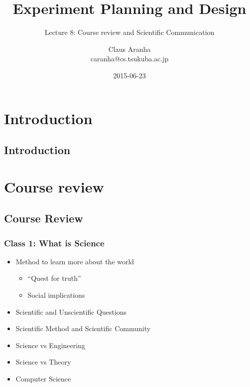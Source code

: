\documentclass[10pt]{beamer}
\title[]{Experiment Planning and Design}
\subtitle[]{Lecture 8: Course review and Scientific Communication}
\author[Claus Aranha]{Claus Aranha\\{\footnotesize caranha@cs.tsukuba.ac.jp}}
\institute{Department of Computer Science}
\date{2015-06-23}
\begin{document}
\section{Introduction}
\subsection{Introduction}
\begin{frame}
  \maketitle
\end{frame}

\section{Course review}
\subsection{Course Review}

\begin{frame}
  \frametitle{Class 1: What is Science}
  \begin{itemize}
  \item Method to learn more about the world
    \begin{itemize}
    \item ``Quest for truth''
    \item Social implications
    \end{itemize}
  \item Scientific and Unscientific Questions
  \item Scientific Method and Scientific Community
  \item Science vs Engineering
  \item Science vs Theory
  \item Computer Science
  \end{itemize}
\end{frame}
\end{document}
